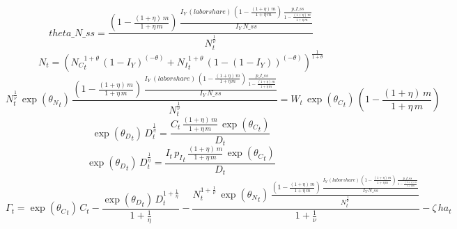 \begin{dmath*}
theta\_N\_ss = \frac{\left(1-\frac{\left(1+{{\eta}}\right)\, {{m}}}{1+{{\eta}}\, {{m}}}\right)\, \frac{{{I_Y}}\, {(labor share)}\, \left(1-\frac{\left(1+{{\eta}}\right)\, {{m}}}{1+{{\eta}}\, {{m}}}\right)\, \frac{{p\_I\_ss}}{1-\frac{\left(1+{{\eta}}\right)\, {{m}}}{1+{{\eta}}\, {{m}}}}}{{{I_Y}}\, {N\_ss}}}{{{N}}_{t}^{\frac{1}{{\nu}}}}
\end{dmath*}
\begin{dmath}
{{N}}_{t}=\left({{N_C}}_{t}^{1+{{\theta}}}\, \left(1-{{I_Y}}\right)^{\left(-{{\theta}}\right)}+{{N_I}}_{t}^{1+{{\theta}}}\, \left(1-\left(1-{{I_Y}}\right)\right)^{\left(-{{\theta}}\right)}\right)^{\frac{1}{1+{{\theta}}}}
\end{dmath}
\begin{dmath}
{{N}}_{t}^{\frac{1}{{\nu}}}\, \exp\left({{\theta_N}}_{t}\right)\, \frac{\left(1-\frac{\left(1+{{\eta}}\right)\, {{m}}}{1+{{\eta}}\, {{m}}}\right)\, \frac{{{I_Y}}\, {(labor share)}\, \left(1-\frac{\left(1+{{\eta}}\right)\, {{m}}}{1+{{\eta}}\, {{m}}}\right)\, \frac{{p\_I\_ss}}{1-\frac{\left(1+{{\eta}}\right)\, {{m}}}{1+{{\eta}}\, {{m}}}}}{{{I_Y}}\, {N\_ss}}}{{{N}}_{t}^{\frac{1}{{\nu}}}}={{W}}_{t}\, \exp\left({{\theta_C}}_{t}\right)\, \left(1-\frac{\left(1+{{\eta}}\right)\, {{m}}}{1+{{\eta}}\, {{m}}}\right)
\end{dmath}
\begin{dmath}
\exp\left({{\theta_D}}_{t}\right)\, {{D}}_{t}^{\frac{1}{{{\eta}}}}=\frac{{{C}}_{t}\, \frac{\left(1+{{\eta}}\right)\, {{m}}}{1+{{\eta}}\, {{m}}}\, \exp\left({{\theta_C}}_{t}\right)}{{{D}}_{t}}
\end{dmath}
\begin{dmath}
\exp\left({{\theta_D}}_{t}\right)\, {{D}}_{t}^{\frac{1}{{{\eta}}}}=\frac{{{I}}_{t}\, {{p_I}}_{t}\, \frac{\left(1+{{\eta}}\right)\, {{m}}}{1+{{\eta}}\, {{m}}}\, \exp\left({{\theta_C}}_{t}\right)}{{{D}}_{t}}
\end{dmath}
\begin{dmath}
{{\Gamma}}_{t}=\exp\left({{\theta_C}}_{t}\right)\, {{C}}_{t}-\frac{\exp\left({{\theta_D}}_{t}\right)\, {{D}}_{t}^{1+\frac{1}{{{\eta}}}}}{1+\frac{1}{{{\eta}}}}-\frac{{{N}}_{t}^{1+\frac{1}{{\nu}}}\, \exp\left({{\theta_N}}_{t}\right)\, \frac{\left(1-\frac{\left(1+{{\eta}}\right)\, {{m}}}{1+{{\eta}}\, {{m}}}\right)\, \frac{{{I_Y}}\, {(labor share)}\, \left(1-\frac{\left(1+{{\eta}}\right)\, {{m}}}{1+{{\eta}}\, {{m}}}\right)\, \frac{{p\_I\_ss}}{1-\frac{\left(1+{{\eta}}\right)\, {{m}}}{1+{{\eta}}\, {{m}}}}}{{{I_Y}}\, {N\_ss}}}{{{N}}_{t}^{\frac{1}{{\nu}}}}}{1+\frac{1}{{\nu}}}-{{\zeta}}\, {{ha}}_{t}
\end{dmath}
